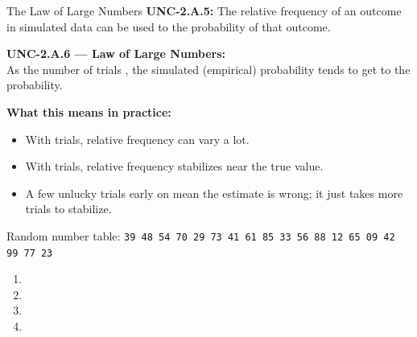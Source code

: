 \documentclass[10pt]{article}
\begin{document}
\begin{notesbox}{The Law of Large Numbers}
\small
\textbf{UNC-2.A.5:} The relative frequency of an outcome in simulated data can be used
to  the probability of that outcome.

\vspace{8pt}
\textbf{UNC-2.A.6 --- Law of Large Numbers:}\\
As the number of trials , the simulated (empirical) probability tends to
get  to the  probability.

\vspace{8pt}
\textbf{What this means in practice:}
\begin{itemize}[itemsep=4pt]
  \item With  trials, relative frequency can vary a lot.
  \item With  trials, relative frequency stabilizes near the true value.
  \item A few unlucky trials early on  mean the estimate is wrong; it just takes more trials to stabilize.
\end{itemize}
\end{notesbox}

\vspace{0.1in}

\begin{practicebox}
\small
Random number table: \texttt{39 48 54 70 29 73 41 61 85 33  56 88 12 65 09 42 99 77 23}

\vspace{8pt}
\begin{enumerate}[leftmargin=1.5em, itemsep=8pt]
  \item {}
  \item {}
  \item {}
  \item {}
\end{enumerate}
\end{practicebox}
\end{document}
